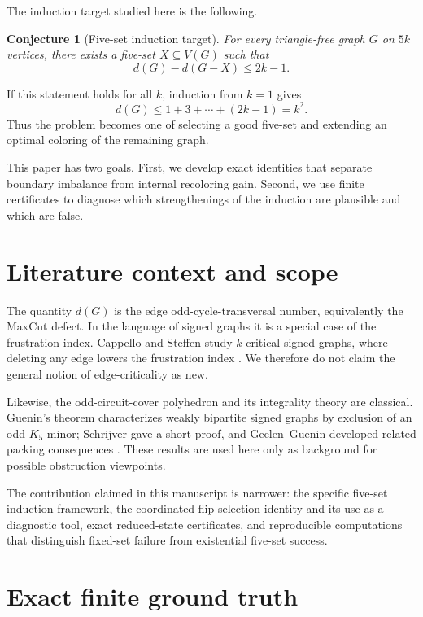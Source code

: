 \documentclass[11pt]{article}
\newtheorem{conjecture}{Conjecture}
\newcommand{\dd}{d}
\begin{document}
The induction target studied here is the following.

\begin{conjecture}[Five-set induction target]
For every triangle-free graph $G$ on $5k$ vertices, there exists a
five-set $X\subseteq V(G)$ such that
\[
\dd(G)-\dd(G-X)\le 2k-1.
\]
\end{conjecture}

If this statement holds for all $k$, induction from $k=1$ gives
\[
\dd(G)\le 1+3+\cdots+(2k-1)=k^2.
\]
Thus the problem becomes one of selecting a good five-set and extending an
optimal coloring of the remaining graph.

This paper has two goals.  First, we develop exact identities that separate
boundary imbalance from internal recoloring gain.  Second, we use finite
certificates to diagnose which strengthenings of the induction are
plausible and which are false.

\section{Literature context and scope}

The quantity $\dd(G)$ is the edge odd-cycle-transversal number, equivalently
the MaxCut defect.  In the language of signed graphs it is a special case
of the frustration index.  Cappello and Steffen study $k$-critical signed
graphs, where deleting any edge lowers the frustration index
\cite{CappelloSteffen}.  We therefore do not claim the general notion of
edge-criticality as new.

Likewise, the odd-circuit-cover polyhedron and its integrality theory are
classical.  Guenin's theorem characterizes weakly bipartite signed graphs
by exclusion of an odd-$K_5$ minor; Schrijver gave a short proof, and
Geelen--Guenin developed related packing consequences
\cite{Schrijver,Guenin}.  These results are used here only as background
for possible obstruction viewpoints.

The contribution claimed in this manuscript is narrower: the specific
five-set induction framework, the coordinated-flip selection identity and
its use as a diagnostic tool, exact reduced-state certificates, and
reproducible computations that distinguish fixed-set failure from
existential five-set success.

\section{Exact finite ground truth}
\end{document}
